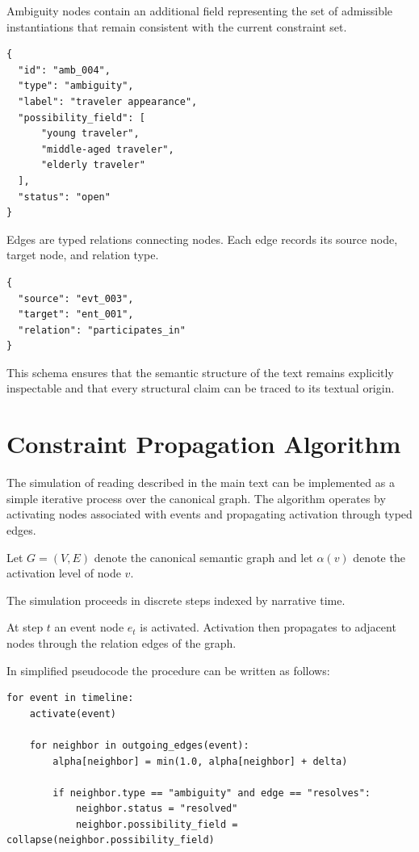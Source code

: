 \documentclass[12pt, a4paper]{article}
\begin{document}
Ambiguity nodes contain an additional field representing the set of admissible instantiations that remain consistent with the current constraint set.

\begin{verbatim}
{
  "id": "amb_004",
  "type": "ambiguity",
  "label": "traveler appearance",
  "possibility_field": [
      "young traveler",
      "middle-aged traveler",
      "elderly traveler"
  ],
  "status": "open"
}
\end{verbatim}

Edges are typed relations connecting nodes. Each edge records its source node, target node, and relation type.

\begin{verbatim}
{
  "source": "evt_003",
  "target": "ent_001",
  "relation": "participates_in"
}
\end{verbatim}

This schema ensures that the semantic structure of the text remains explicitly inspectable and that every structural claim can be traced to its textual origin.

\section{Constraint Propagation Algorithm}

The simulation of reading described in the main text can be implemented as a simple iterative process over the canonical graph. The algorithm operates by activating nodes associated with events and propagating activation through typed edges.

Let $G = (V,E)$ denote the canonical semantic graph and let $\alpha(v)$ denote the activation level of node $v$.

The simulation proceeds in discrete steps indexed by narrative time.

At step $t$ an event node $e_t$ is activated. Activation then propagates to adjacent nodes through the relation edges of the graph.

In simplified pseudocode the procedure can be written as follows:

\begin{verbatim}
for event in timeline:
    activate(event)

    for neighbor in outgoing_edges(event):
        alpha[neighbor] = min(1.0, alpha[neighbor] + delta)

        if neighbor.type == "ambiguity" and edge == "resolves":
            neighbor.status = "resolved"
            neighbor.possibility_field = collapse(neighbor.possibility_field)
\end{verbatim}
\end{document}
